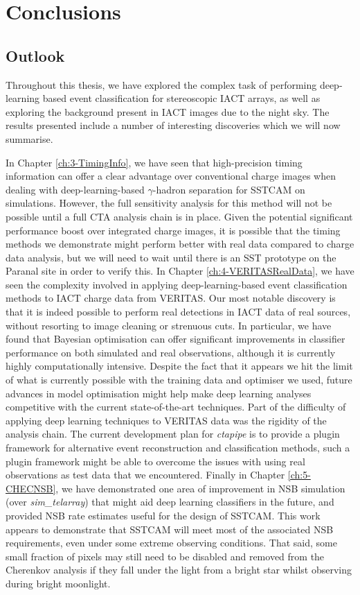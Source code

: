 \chapter{\label{ch6-Conclusions} Conclusions}
\minitoc
\section{Outlook}
Throughout this thesis, we have explored the complex task of performing deep-learning based event classification for stereoscopic IACT arrays, as well as exploring the background present in IACT images due to the night sky. The results presented include a number of interesting discoveries which we will now summarise.

In Chapter \ref{ch:3-TimingInfo}, we have seen that high-precision timing information can offer a clear advantage over conventional charge images when dealing with deep-learning-based $\gamma$-hadron separation for SSTCAM on simulations. However, the full sensitivity analysis for this method will not be possible until a full CTA analysis chain is in place. Given the potential significant performance boost over integrated charge images, it is possible that the timing methods we demonstrate might perform better with real data compared to charge data analysis, but we will need to wait until there is an SST prototype on the Paranal site in order to verify this. In Chapter \ref{ch:4-VERITASRealData}, we have seen the complexity involved in applying deep-learning-based event classification methods to IACT charge data from VERITAS. Our most notable discovery is that it is indeed possible to perform real detections in IACT data of real sources, without resorting to image cleaning or strenuous cuts. In particular, we have found that Bayesian optimisation can offer significant improvements in classifier performance on both simulated and real observations, although it is currently highly computationally intensive. Despite the fact that it appears we hit the limit of what is currently possible with the training data and optimiser we used, future advances in model optimisation might help make deep learning analyses competitive with the current state-of-the-art techniques. Part of the difficulty of applying deep learning techniques to VERITAS data was the rigidity of the analysis chain. The current development plan for \textit{ctapipe} is to provide a plugin framework for alternative event reconstruction and classification methods, such a plugin framework might be able to overcome the issues with using real observations as test data that we encountered. Finally in Chapter \ref{ch:5-CHECNSB}, we have demonstrated one area of improvement in NSB simulation (over \textit{sim\_telarray}) that might aid deep learning classifiers in the future, and provided NSB rate estimates useful for the design of SSTCAM. This work appears to demonstrate that SSTCAM will meet most of the associated NSB requirements, even under some extreme observing conditions. That said, some small fraction of pixels may still need to be disabled and removed from the Cherenkov analysis if they fall under the light from a bright star whilst observing during bright moonlight.

